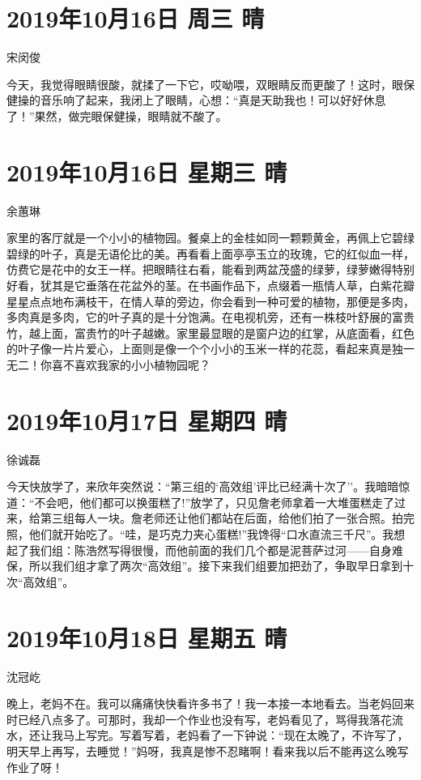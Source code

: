 \section{2019年10月16日 周三 晴}

宋闵俊

今天，我觉得眼睛很酸，就揉了一下它，哎呦喂，双眼睛反而更酸了！这时，眼保健操的音乐响了起来，我闭上了眼睛，心想：``真是天助我也！可以好好休息了！''果然，做完眼保健操，眼睛就不酸了。

\section{2019年10月16日 星期三 晴}

余蕙琳

家里的客厅就是一个小小的植物园。餐桌上的金桂如同一颗颗黄金，再佩上它碧绿碧绿的叶子，真是无语伦比的美。再看看上面亭亭玉立的玫瑰，它的红似血一样，仿费它是花中的女王一样。把眼睛往右看，能看到两盆茂盛的绿萝，绿萝嫩得特别好看，犹其是它垂落在花盆外的茎。在书画作品下，点缀着一瓶情人草，白紫花瓣星星点点地布满枝干，在情人草的旁边，你会看到一种可爱的植物，那便是多肉，多肉真是多肉，它的叶子真的是十分饱满。在电视机旁，还有一株枝叶舒展的富贵竹，越上面，富贵竹的叶子越嫩。家里最显眼的是窗户边的红掌，从底面看，红色的叶子像一片片爱心，上面则是像一个个小小的玉米一样的花蕊，看起来真是独一无二！你喜不喜欢我家的小小植物园呢？

\section{2019年10月17日 星期四 晴}

徐诚磊

今天快放学了，来欣年突然说：``第三组的`高效组'评比已经满十次了''。我暗暗惊道：``不会吧，他们都可以换蛋糕了!''放学了，只见詹老师拿着一大堆蛋糕走了过来，给第三组每人一块。詹老师还让他们都站在后面，给他们拍了一张合照。拍完照，他们就开始吃了。``哇，是巧克力夹心蛋糕!''我馋得``口水直流三千尺''。我想起了我们组：陈浩然写得很慢，而他前面的我们几个都是泥菩萨过河------自身难保，所以我们组才拿了两次``高效组''。接下来我们组要加把劲了，争取早日拿到十次``高效组''。

\section{2019年10月18日 星期五 晴}

沈冠屹

晚上，老妈不在。我可以痛痛快快看许多书了！我一本接一本地看去。当老妈回来时已经八点多了。可那时，我却一个作业也没有写，老妈看见了，骂得我落花流水，还让我马上写完。写着写着，老妈看了一下钟说：``现在太晚了，不许写了，明天早上再写，去睡觉！''妈呀，我真是惨不忍睹啊！看来我以后不能再这么晚写作业了呀！

